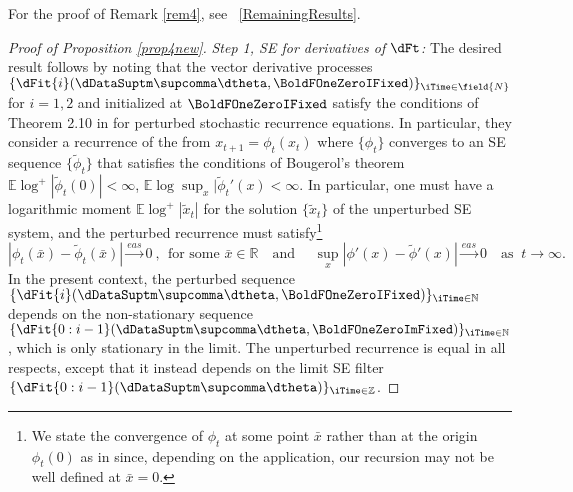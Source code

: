 



\bigskip\noindent 
For the proof of Remark \ref{rem4}, see \SupplementaryAppendix\ \ref{RemainingResults}.


\proofskip
%
%
%
%
\begin{proof}[Proof of Proposition \ref{prop4new}]
\textit{Step 1, SE for derivatives of $\dFt$:}
The desired result follows by noting that the vector derivative processes 
$\{\dFit{i}(\dDataSuptm\supcomma\dtheta,\BoldFOneZeroIFixed)\}_{\iTime\in \field{N}}$ 
for $i=1,2$ and initialized at $\BoldFOneZeroIFixed$ satisfy the conditions of Theorem 2.10 in \cite{smikosch2006} for perturbed stochastic recurrence equations. In particular, they consider a  recurrence of the from $x_{t+1} = \phi_{t}(x_{t})$ where $\{\phi_{t}\}$ converges to an  SE sequence $\{\tilde \phi_{t}\}$ that satisfies the conditions of Bougerol's theorem $\mathbb{E} \log^{+}|\tilde \phi_{t}(0) |<\infty$, $\mathbb{E} \log \sup_{x}|\tilde \phi_{t}'(x)<\infty$. In particular, one must have a logarithmic moment  $\mathbb{E}\log^{+}|\tilde x_{t}|$ for the solution $\{\tilde x_{t}\}$  of the unperturbed SE system, and the perturbed recurrence must satisfy\footnote{We state the convergence of $\phi_{t}$ at some point $\bar{x}$ rather than at the origin $\phi_{t}(0)$ as in \cite{smikosch2006} since, depending on the application, our recursion may not be well defined at $\bar{x}=0$.} 
\begin{equation*}
	|\phi_{t}(\bar{x}) - \tilde\phi_{t}(\bar{x})| \stackrel{eas}{\to} 0 \ , \ \ \text{for some $\bar{x} \in \mathbb{R}$} \quad \text{and } \quad \sup_{x}|\phi'(x)-\tilde \phi'(x)| \stackrel{eas}{\to} 0 \quad \text{as } \ t \to \infty. 
\end{equation*}
In the present context, the perturbed sequence 
$\{\dFit{i}(\dDataSuptm\supcomma\dtheta,\BoldFOneZeroIFixed)\}_{\iTime \in \mathbb{N}}$
depends on the non-stationary sequence
$\{\dFit{0:i-1}(\dDataSuptm\supcomma\dtheta,\BoldFOneZeroImFixed)\}_{\iTime \in \mathbb{N}}$, 
which is only stationary in the limit. 
The unperturbed recurrence is equal in all respects, except that it instead depends on the limit SE filter 
$\{\dFit{0:i-1}(\dDataSuptm\supcomma\dtheta)\}_{\iTime \in \mathbb{Z}}$. 


\end{proof}
